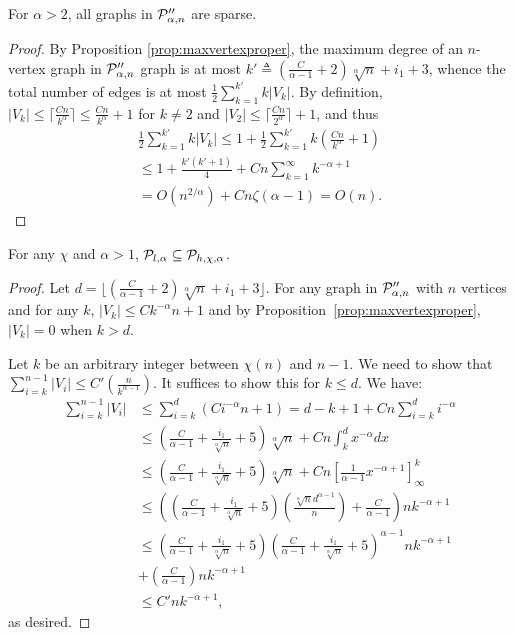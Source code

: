 \begin{proposition}\label{prop:powerlawsparse}
For $\alpha > 2$, all graphs in $ \mathcal{P}''_{\alpha,n}$ are sparse.
\end{proposition}
\begin{proof}
By Proposition \ref{prop:maxvertexproper}, the maximum degree of an $n$-vertex graph in $ \mathcal{P}''_{\alpha,n}$
graph is at most $k' \triangleq \left(\frac{C}{\alpha - 1} + 2\right) \sqrt[\alpha]{n} + i_1 + 3$, whence
the total number of edges is at most $\frac{1}{2}\sum_{k=1}^{k'} k \vert V_k\vert$. By definition,
$\vert V_k \vert\leq \lceil \frac{Cn}{k^\alpha}\rceil \leq \frac{Cn}{k^{\alpha}} + 1$ for $k\neq 2$ and $\vert V_2\vert\leq\lceil\frac{Cn}{2^{\alpha}}\rceil + 1$, and thus
\begin{align*}
\frac{1}{2}\sum_{k=1}^{k'} k\vert V_k\vert \leq 1 + \frac{1}{2}\sum_{k=1}^{k'} k \left(\frac{Cn}{k^{\alpha}} + 1 \right) \\
\leq 1 + \frac{k'(k'+1)}{4} + Cn\sum_{k=1}^{\infty} k^{-\alpha+1} \\
= O(n^{2/\alpha}) + Cn \zeta(\alpha - 1) = O(n).
\end{align*}
\end{proof}

\begin{proposition}\label{prop:Contained}
For any $\chi$ and $\alpha > 1$,
$ \mathcal{P}_{l,\alpha} \subseteq  \mathcal{P}_{h,\chi,\alpha}$.
\end{proposition}
\begin{proof}
Let $d = \lfloor(\frac C{\alpha - 1} + 2)\sqrt[\alpha]{n} + i_1 + 3\rfloor$. For any graph in $ \mathcal{P}''_{\alpha,n}$ with $n$ vertices and for any $k$, $\vert V_k\vert\leq Ck^{-\alpha}n + 1$ and by Proposition~\ref{prop:maxvertexproper}, $\vert V_k\vert = 0$ when $k > d$.

Let $k$ be an arbitrary integer between $\chi(n)$ and $n-1$. We need to show that $\sum_{i = k}^{n-1} {\vert V_i\vert} \leq C'(\frac{n}{k^{\alpha-1}})$. It suffices to show this for $k\leq d$. We have:
\begin{align*}
  \sum_{i = k}^{n-1} {\vert V_i\vert} & \leq \sum_{i = k}^d(Ci^{-\alpha}n + 1)=    d - k + 1 + Cn\sum_{i = k}^d i^{-\alpha}\\
  & \leq \left(\frac C{\alpha - 1} + \frac{i_1}{\sqrt[\alpha]n} + 5\right)\sqrt[\alpha]{n} + Cn\int_k^d x^{-\alpha}dx\\
  & \leq \left(\frac C{\alpha - 1} + \frac{i_1}{\sqrt[\alpha]n} + 5\right)\sqrt[\alpha]{n} + Cn\left[\frac 1{\alpha - 1}x^{-\alpha+1}\right]_\infty^k\\
  & \leq \left(\left(\frac C{\alpha - 1} + \frac{i_1}{\sqrt[\alpha]n} + 5\right)\left(\frac{\sqrt[\alpha]nd^{\alpha-1}}n\right) + \frac {C}{\alpha - 1}\right)nk^{-\alpha +1}\\
  & \leq \left(\frac C{\alpha - 1} + \frac{i_1}{\sqrt[\alpha]n} + 5\right)\left(\frac C{\alpha-1} + \frac{i_1}{\sqrt[\alpha]n} + 5\right)^{\alpha - 1}  nk^{-\alpha+1} \\
  & +  \left(\frac{C}{\alpha - 1}\right) nk^{-\alpha+1} \\
  & \leq C'nk^{-\alpha+1},
\end{align*}
as desired.
\end{proof}

